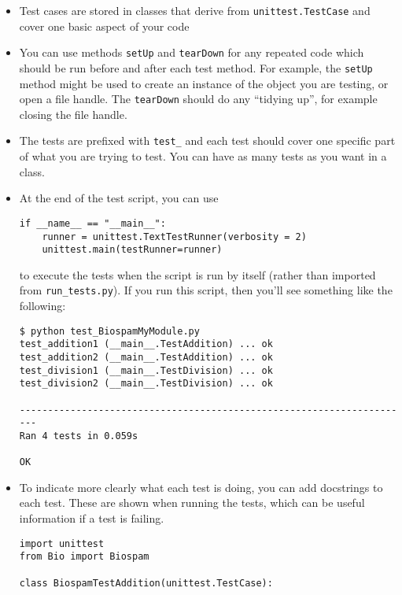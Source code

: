 \begin{itemize}
  \item Test cases are stored in classes that derive from
    \verb|unittest.TestCase| and cover one basic aspect of your code

  \item You can use methods \verb|setUp| and \verb|tearDown| for any repeated
    code which should be run before and after each test method.  For example,
    the \verb|setUp| method might be used to create an instance of the object
    you are testing, or open a file handle.  The \verb|tearDown| should do any
    ``tidying up'', for example closing the file handle.

  \item The tests are prefixed with \verb|test_| and each test should cover
    one specific part of what you are trying to test. You can have as
    many tests as you want in a class.

  \item At the end of the test script, you can use
\begin{verbatim}
if __name__ == "__main__":
    runner = unittest.TextTestRunner(verbosity = 2)
    unittest.main(testRunner=runner)
\end{verbatim}
        to execute the tests when the script is run by itself (rather than
        imported from \verb|run_tests.py|).
        If you run this script, then you'll see something like the following:

\begin{verbatim}
$ python test_BiospamMyModule.py
test_addition1 (__main__.TestAddition) ... ok
test_addition2 (__main__.TestAddition) ... ok
test_division1 (__main__.TestDivision) ... ok
test_division2 (__main__.TestDivision) ... ok

----------------------------------------------------------------------
Ran 4 tests in 0.059s

OK
\end{verbatim}

  \item To indicate more clearly what each test is doing, you can add
        docstrings to each test.  These are shown when running the tests,
        which can be useful information if a test is failing.

\begin{verbatim}
import unittest
from Bio import Biospam

class BiospamTestAddition(unittest.TestCase):


\end{verbatim}
\end{itemize}
